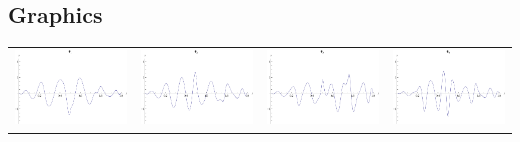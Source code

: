 \documentclass{article}
\begin{document}
\begin{landscape}
\subsection{Graphics}
\begin{tabular}{cccc}
\includegraphics[width=5.0cm]{decic_wavelet_1.pdf}& \includegraphics[width=5.0cm]{decic_wavelet_2.pdf}& \includegraphics[width=5.0cm]{decic_wavelet_3.pdf}& \includegraphics[width=5.0cm]{decic_wavelet_4.pdf} \\

\end{tabular}
\end{landscape}
\end{document}
